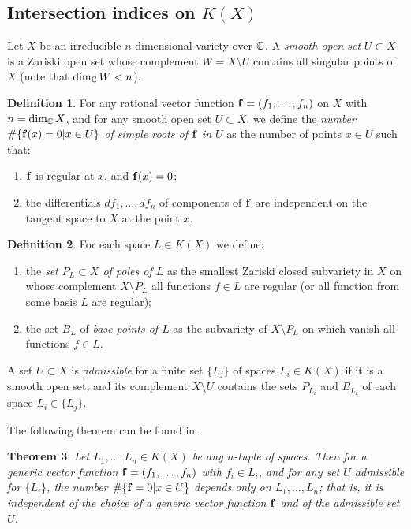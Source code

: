 \documentclass[11pt]{article}
\theoremstyle{plain}
\newtheorem{theorem}{Theorem}[section]
\theoremstyle{definition}
\newtheorem{definition}[theorem]{Definition}
\begin{document}
\subsection{Intersection indices on $K(X)$}
Let $X$ be an irreducible $n$-dimensional variety over $\Bbb C$. A {\it smooth open set}  $U\subset X$ is  a   Zariski open set whose complement $W=X\setminus  U $ contains  all singular points of $X$ (note that $\dim_{\Bbb C} W<n$).

\begin{definition} For any  rational vector function $\bold f=(f_1,\dots,f_n)$  on $X$ with $n=\dim_\Bbb CX$, and  for  any smooth open set  $U\subset X$,   we define the {\it number $\#\{ \bold f(x)=0|x\in U\}$   of  simple roots of $\bold f$  in $U$} as the number of points $x\in U$ such that:
\begin{enumerate}
\item  $\bold f$ is regular at $x$, and $\bold f(x)=0$;
\item the differentials $df_1,\dots, df_n$ of components of $\bold f$  are independent on the tangent space to $X$ at the point  $x$.
\end{enumerate}
\end{definition}

\begin{definition} For each space $L\in K(X)$ we define:
\begin{enumerate}
\item the {\it set  $P_L\subset X$ of poles of $L$} as the smallest Zariski closed subvariety in $X$ on whose complement $X\setminus P_L$ all functions $f\in L$ are regular (or all function from some basis  $L$ are regular);
\item  the set $B_L$  of {\it base points of $L$} as the subvariety of $X\setminus P_L$ on which vanish all functions   $f\in L$.
\end{enumerate}
A  set $U\subset X$ is {\it admissible} for a finite set  $\{L_j\}$  of spaces $L_i\in K(X)$ if it is a smooth open set, and its complement $X\setminus U$  contains the sets $P_{L_i}$ and $B_{L_i}$  of each space $L_i\in \{L_j\}$.
\end{definition}

The following theorem can be found in \cite{K-K10}.

\begin{theorem}\label{index} Let $L_1,\dots,L_n\in K(X)$ be any $n$-tuple of spaces. Then for a generic vector function $\bold f=(f_1,\dots,f_n)$ with  $f_i\in L_i$, and for any set $U$ admissible for $\{L_i\}$, the number  $\#\{\bold f=0|x\in U\}$ depends only on $L_1,\dots,L_n$; that is, it is independent of the choice of a generic vector function $\bold f$ and of the admissible set
$U$.
\end{theorem}
\end{document}
